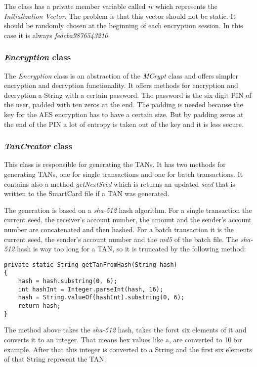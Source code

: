The class has a private member variable called \textit{iv} which represents the \textit{Initialization Vector}. The problem is that this vector should not be static. It should be randomly chosen at the beginning of each encryption session. In this case it is always \textit{fedcba9876543210}.

\subsubsection{\textit{Encryption} class}

The \textit{Encryption} class is an abstraction of the \textit{MCrypt} class and offers simpler encryption and decryption functionality. It offers methods for encryption and decryption a String with a certain password. The password is the six digit PIN of the user, padded with ten zeros at the end. The padding is needed because the key for the AES encryption has to have a certain size. But by padding zeros at the end of the PIN a lot of entropy is taken out of the key and it is less secure.

\subsubsection{\textit{TanCreator} class}

This class is responsible for generating the TANs. It has two methods for generating TANs, one for single transactions and one for batch transactions. It contains also a method \textit{getNextSeed} which is returns an updated \textit{seed} that is written to the SmartCard file if a TAN was generated.

The generation is based on a \textit{sha-512} hash algorithm. For a single transaction the current seed,  the receiver's account number, the amount and the sender's account number are concatenated and then hashed. For a batch transaction it is the current seed, the sender's account number and the \textit{md5} of the batch file. The \textit{sha-512} hash is way too long for a TAN, so it is truncated by the following method:

\begin{lstlisting}[caption=getTanFromHash method]
private static String getTanFromHash(String hash)
{
	hash = hash.substring(0, 6);
	int hashInt = Integer.parseInt(hash, 16);
	hash = String.valueOf(hashInt).substring(0, 6);
	return hash;
}
\end{lstlisting}

The method above takes the \textit{sha-512} hash, takes the forst six elements of it and converts it to an integer. That means hex values like a, are converted to 10 for example. After that this integer is converted to a String and the first six elements of that String represent the TAN.

